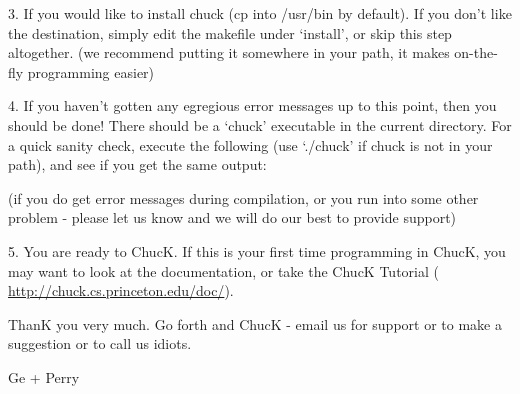 
3. If you would like to install chuck (cp into /usr/bin by default). If you 
don't like the destination, simply edit the makefile under `install', or 
skip this step altogether. (we recommend putting it somewhere in your 
path, it makes on-the-fly programming easier)


4. If you haven't gotten any egregious error messages up to this point, 
then you should be done! There should be a `chuck' executable in the 
current directory. For a quick sanity check, execute the following (use 
`./chuck' if chuck is not in your path), and see if you get the same output:


(if you do get error messages during compilation, or you run into some 
other problem - please let us know and we will do our best to provide 
support) 

5. You are ready to ChucK. If this is your first time programming in 
ChucK, you may want to look at the documentation, or take the ChucK 
Tutorial ( \href{http://chuck.cs.princeton.edu/doc}{http://chuck.cs.princeton.edu/doc/}). 

ThanK you very much. Go forth and ChucK - email us for support or to make a 
suggestion or to call us idiots.

Ge + Perry
 